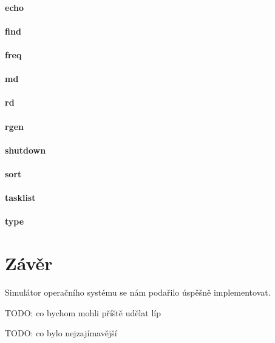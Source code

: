 \documentclass[11pt,a4paper]{scrartcl}
\begin{document}
	\paragraph{echo}
	
	\paragraph{find}
	
	\paragraph{freq}
	
	\paragraph{md}
	
	\paragraph{rd}
	
	\paragraph{rgen}
	
	\paragraph{shutdown}
	
	\paragraph{sort}
	
	\paragraph{tasklist}
	
	\paragraph{type}
	
	\section{Závěr}
	Simulátor operačního systému se nám podařilo úspěšně implementovat. 
	
	TODO: co bychom mohli příště udělat líp 
	
	TODO: co bylo nejzajímavější
	
\end{document}
